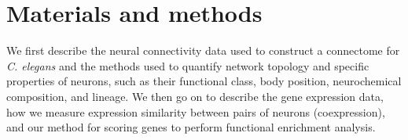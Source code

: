 \documentclass[10pt,letterpaper]{article}
\begin{document}


\section*{Materials and methods}

We first describe the neural connectivity data used to construct a connectome for \textit{C. elegans} and the methods used to quantify network topology and specific properties of neurons, such as their functional class, body position, neurochemical composition, and lineage.
We then go on to describe the gene expression data, how we measure expression similarity between pairs of neurons (coexpression), and our method for scoring genes to perform functional enrichment analysis.
\end{document}
